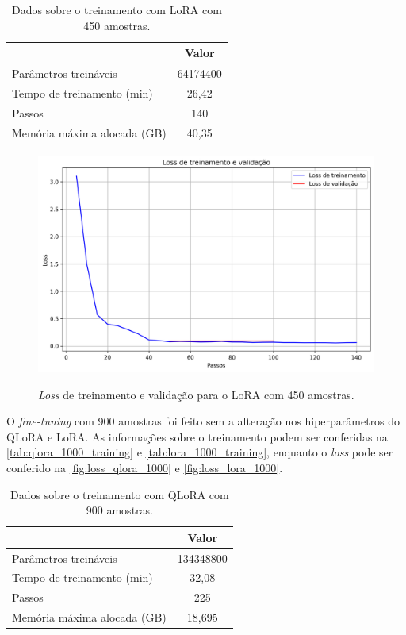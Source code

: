 \begin{table}[ht]
    \caption{\small Dados sobre o treinamento com \ac{LoRA} com 450 amostras.}
    \centering
    \begin{tabular}{l|c}
        \hline
                                    & Valor    \\ \hline
        Parâmetros treináveis       & 64174400 \\
        Tempo de treinamento (min)  & 26,42    \\
        Passos                      & 140      \\
        Memória máxima alocada (GB) & 40,35    \\ \hline
    \end{tabular}
    \label{tab:lora_500_training}
\end{table}

\clearpage

\begin{figure}[ht]
    \centering
    \caption{\small \textit{Loss} de treinamento e validação para o \ac{LoRA} com 450 amostras.}
    \includegraphics[width=0.725\columnwidth,keepaspectratio]{images/loss_lora_500.png}
    \label{fig:loss_lora_500}
\end{figure}

O \textit{fine-tuning} com 900 amostras foi feito sem a alteração nos hiperparâmetros do \ac{QLoRA} e \ac{LoRA}. As
informações sobre o treinamento podem ser conferidas na \autoref{tab:qlora_1000_training} e
\autoref{tab:lora_1000_training}, enquanto o \textit{loss} pode ser conferido na \autoref{fig:loss_qlora_1000} e
\autoref{fig:loss_lora_1000}.

\begin{table}[ht]
    \caption{\small Dados sobre o treinamento com \ac{QLoRA} com 900 amostras.}
    \centering
    \begin{tabular}{l|c}
        \hline
                                    & Valor     \\ \hline
        Parâmetros treináveis       & 134348800 \\
        Tempo de treinamento (min)  & 32,08     \\
        Passos                      & 225       \\
        Memória máxima alocada (GB) & 18,695    \\ \hline
    \end{tabular}
    \label{tab:qlora_1000_training}
\end{table}

